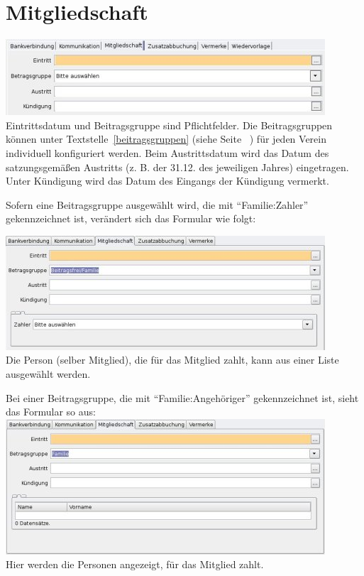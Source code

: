 \documentclass[a4paper,BCOR30mm,DIV14,pdftex,liststotoc,footsepline,openany]{scrbook}
\begin{document}
\section{Mitgliedschaft}
\includegraphics{./screenshots/mitgliedmitgliedschaft.jpg}\\

Eintrittsdatum und Beitragsgruppe sind Pflichtfelder. Die Beitragsgruppen können unter Textstelle~\ref{beitragsgruppen} (siehe Seite ~\pageref{beitragsgruppen}) für jeden Verein individuell
konfiguriert werden. Beim Austrittsdatum wird das Datum des satzungsgemäßen Austritts (z. B. der 31.12. des jeweiligen
Jahres) eingetragen. Unter Kündigung wird das Datum des Eingangs der Kündigung vermerkt.

Sofern eine Beitragsgruppe ausgewählt wird, die mit ``Familie:Zahler'' gekennzeichnet ist, verändert sich das Formular
wie folgt:

\includegraphics{./screenshots/mitgliedmitgliedschaftzahler.jpg}\\
Die Person (selber Mitglied), die für das Mitglied zahlt, kann aus einer Liste ausgewählt werden. 

Bei einer Beitragsgruppe, die mit ``Familie:Angehöriger'' gekennzeichnet ist, sieht das Formular so aus:\\
\includegraphics{./screenshots/mitgliedmitgliedschaftfamilienangehoerige.jpg}\\
Hier werden die Personen angezeigt, für das Mitglied zahlt.
\end{document}
